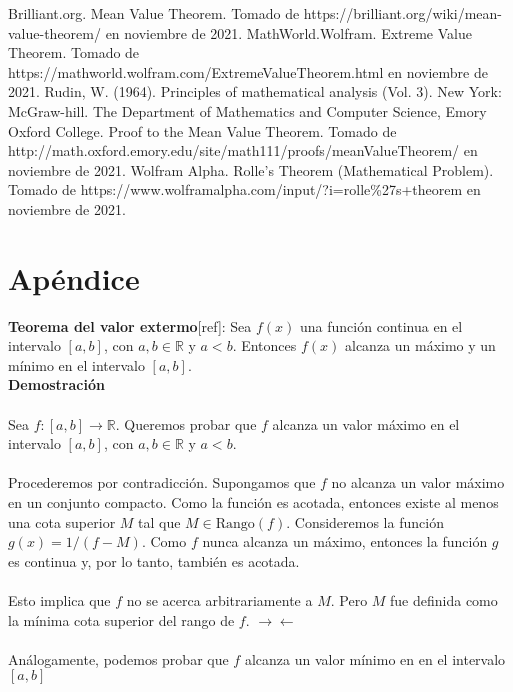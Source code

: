 \documentclass[letter]{article}
\begin{document}

\newpage
\begin{thebibliography}{0}

  \bibitem{}Brilliant.org. Mean Value Theorem. Tomado de https://brilliant.org/wiki/mean-value-theorem/ en noviembre de 2021.
  \bibitem{}MathWorld.Wolfram. Extreme Value Theorem. Tomado de https://mathworld.wolfram.com/ExtremeValueTheorem.html en noviembre de 2021.
  \bibitem{}Rudin, W. (1964). Principles of mathematical analysis (Vol. 3). New York: McGraw-hill.
  \bibitem{}The Department of Mathematics and Computer Science, Emory Oxford College. Proof to the Mean Value Theorem. Tomado de http://math.oxford.emory.edu/site/math111/proofs/meanValueTheorem/ en noviembre de 2021.
  \bibitem{}Wolfram Alpha. Rolle's Theorem (Mathematical Problem). Tomado de https://www.wolframalpha.com/input/?i=rolle\%27s+theorem en noviembre de 2021.
  
\end{thebibliography}


\section{Apéndice}

\textbf{Teorema del valor extermo}[ref]: Sea $f(x)$ una función continua en el intervalo $[a,b]$, con $a,b\in\mathbb{R}$ y $a<b$. Entonces $f(x)$ alcanza un máximo y un mínimo en el intervalo $[a,b]$.
\vspace{4mm}\\
\textbf{Demostración}
\paragraph{} Sea $f:[a,b]\longrightarrow\mathbb{R}$. Queremos probar que $f$ alcanza un valor máximo en el intervalo $[a,b]$, con $a,b\in\mathbb{R}$ y $a<b$.
\paragraph{}Procederemos por contradicción. Supongamos que $f$ no alcanza un valor máximo en un conjunto compacto. Como la función es acotada, entonces existe al menos una cota superior $M$ tal que $M\in\text{Rango}(f)$. Consideremos la función $g(x)=1/(f-M)$. Como $f$ nunca alcanza un máximo, entonces la función $g$ es continua y, por lo tanto, también es acotada. 
\paragraph{}Esto implica que $f$ no se acerca arbitrariamente a $M$. Pero $M$ fue definida como la mínima cota superior del rango de $f$. $\longrightarrow\longleftarrow$
\paragraph{}Análogamente, podemos probar que $f$ alcanza un valor mínimo en en el intervalo $[a,b]$
\end{document}
